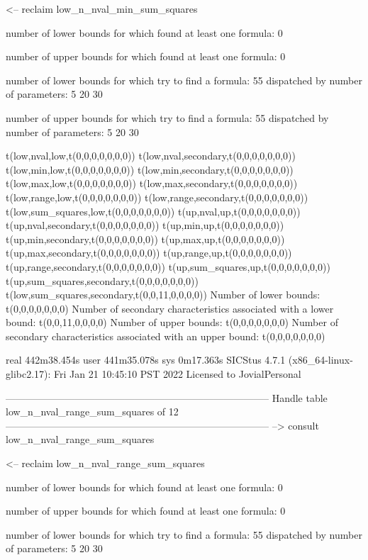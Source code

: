 <-- reclaim low_n_nval_min_sum_squares

number of lower bounds for which found at least one formula: 0

number of upper bounds for which found at least one formula: 0

number of lower bounds for which try to find a formula: 55
dispatched by number of parameters: 5  20  30

number of upper bounds for which try to find a formula: 55
dispatched by number of parameters: 5  20  30

t(low,nval,low,t(0,0,0,0,0,0,0))
t(low,nval,secondary,t(0,0,0,0,0,0,0))
t(low,min,low,t(0,0,0,0,0,0,0))
t(low,min,secondary,t(0,0,0,0,0,0,0))
t(low,max,low,t(0,0,0,0,0,0,0))
t(low,max,secondary,t(0,0,0,0,0,0,0))
t(low,range,low,t(0,0,0,0,0,0,0))
t(low,range,secondary,t(0,0,0,0,0,0,0))
t(low,sum_squares,low,t(0,0,0,0,0,0,0))
t(up,nval,up,t(0,0,0,0,0,0,0))
t(up,nval,secondary,t(0,0,0,0,0,0,0))
t(up,min,up,t(0,0,0,0,0,0,0))
t(up,min,secondary,t(0,0,0,0,0,0,0))
t(up,max,up,t(0,0,0,0,0,0,0))
t(up,max,secondary,t(0,0,0,0,0,0,0))
t(up,range,up,t(0,0,0,0,0,0,0))
t(up,range,secondary,t(0,0,0,0,0,0,0))
t(up,sum_squares,up,t(0,0,0,0,0,0,0))
t(up,sum_squares,secondary,t(0,0,0,0,0,0,0))
t(low,sum_squares,secondary,t(0,0,11,0,0,0,0))
Number of lower bounds:                                             t(0,0,0,0,0,0,0)
Number of secondary characteristics associated with a lower bound:  t(0,0,11,0,0,0,0)
Number of upper bounds:                                             t(0,0,0,0,0,0,0)
Number of secondary characteristics associated with an upper bound: t(0,0,0,0,0,0,0)

real	442m38.454s
user	441m35.078s
sys	0m17.363s
SICStus 4.7.1 (x86_64-linux-glibc2.17): Fri Jan 21 10:45:10 PST 2022
Licensed to JovialPersonal


--------------------------------------------------------------------------------
Handle table low_n_nval_range_sum_squares of 12
--------------------------------------------------------------------------------
--> consult low_n_nval_range_sum_squares

<-- reclaim low_n_nval_range_sum_squares

number of lower bounds for which found at least one formula: 0

number of upper bounds for which found at least one formula: 0

number of lower bounds for which try to find a formula: 55
dispatched by number of parameters: 5  20  30

